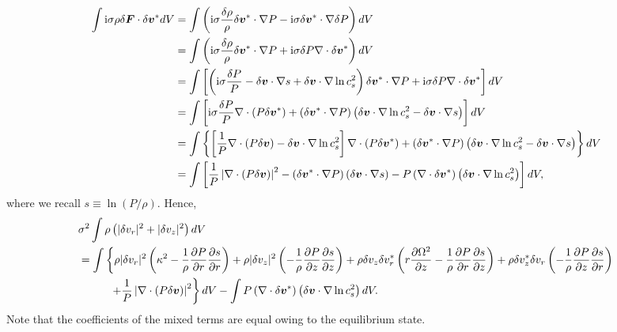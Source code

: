 \begin{align}
  \int \mathrm{i}\sigma\rho \delta \bm{F}\cdot\delta\bm{v}^*dV &=\int\left( \mathrm{i}\sigma \frac{\delta
    \rho}{\rho}\delta\bm{v}^*\cdot \nabla P - \mathrm{i}\sigma \delta
  \bm{v}^*\cdot\nabla \delta P  \right)dV\notag\\
&= \int\left( \mathrm{i}\sigma \frac{\delta
    \rho}{\rho}\delta\bm{v}^*\cdot\nabla P + \mathrm{i}\sigma \delta
 P  \nabla\cdot \delta \bm{v}^*  \right)dV\notag\\
 & = \int\left[
   \left(
   \mathrm{i}\sigma \frac{\delta P}{P} - \delta\bm{v}\cdot\nabla s + \delta
   \bm{v} \cdot \nabla \ln{c_s^2}
   \right)\delta\bm{v}^*\cdot\nabla P  + \mathrm{i}\sigma \delta
   P  \nabla\cdot \delta \bm{v}^*
   \right]dV\notag\\
 & = \int\left[
   \mathrm{i}\sigma\frac{\delta P}{P}\nabla\cdot\left(P\delta\bm{v}^*\right) +
   \left(\delta\bm{v}^*\cdot\nabla P\right) \left(\delta\bm{v} \cdot \nabla
   \ln{c_s^2}   -  \delta\bm{v}\cdot\nabla s\right) 
   \right]dV\notag\\
 & = \int\left\{
   \left[\frac{1}{P}\nabla\cdot\left(P\delta\bm{v}\right) -
   \delta\bm{v}\cdot\nabla\ln{c_s^2}\right]\nabla\cdot\left(P\delta\bm{v}^*\right)
   +\left(\delta\bm{v}^*\cdot\nabla P\right)\left(\delta\bm{v} \cdot \nabla
   \ln{c_s^2}   -  \delta\bm{v}\cdot\nabla s \right)
   \right\}dV \notag\\
   &=\int\left[
     \frac{1}{P}\left|\nabla\cdot\left(P\delta\bm{v}\right)\right|^2 -
     \left(\delta\bm{v}^*\cdot\nabla P\right)\left(\delta\bm{v}\cdot\nabla s
     \right) -
     P\left(\nabla\cdot\delta\bm{v}^*\right)\left(\delta\bm{v}\cdot\nabla\ln{c_s^2}\right) 
     \right]dV,
\end{align}
where we recall $s\equiv\ln{(P/\rho)}$. Hence,
\begin{align}\label{integral_ex}
  &\sigma^2\int\rho\left(|\delta v_r|^2 + |\delta v_z|^2\right)dV \notag\\
&=  \int\left\{
  \rho |\delta v_r|^2 \left(\kappa^2 - \frac{1}{\rho}\frac{\partial P}{\partial
    r}\frac{\partial s}{\partial r}\right)
  + \rho |\delta v_z|^2\left(-\frac{1}{\rho}\frac{\partial P}{\partial
    z}\frac{\partial s}{\partial z}\right)
   + \rho \delta v_z \delta v_r^*\left(r\frac{\partial\Omega^2}{\partial z} -
  \frac{1}{\rho}\frac{\partial P}{\partial
    r}\frac{\partial s}{\partial z}\right) 
  + \rho \delta v_z^*\delta v_r \left(-\frac{1}{\rho}\frac{\partial P}{\partial
    z}\frac{\partial s}{\partial r}\right)\right. \notag\\
&\phantom{==\int}\left.+
  \frac{1}{P}\left|\nabla\cdot\left(P\delta\bm{v}\right)\right|^2
  \right\}dV -\int P\left(\nabla\cdot\delta\bm{v}^*\right)\left(\delta\bm{v}\cdot\nabla\ln{c_s^2}\right)dV.
\end{align}
Note that the coefficients of the mixed terms are equal owing to the
equilibrium state. 

